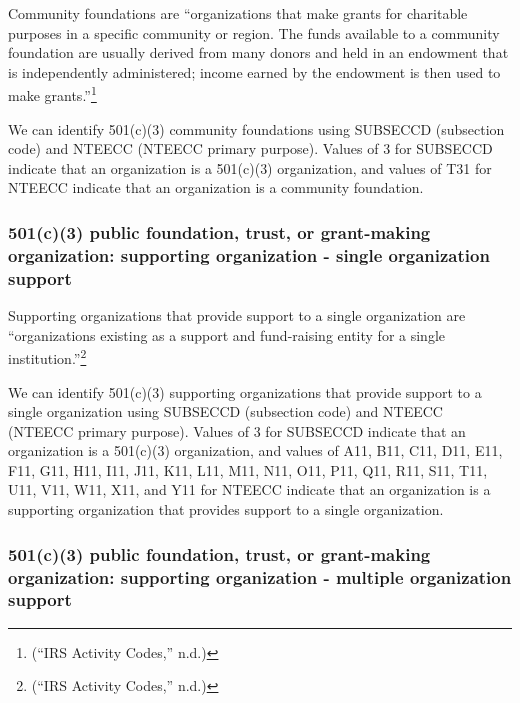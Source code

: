 \documentclass[
  letterpaper,
  DIV=11,
  numbers=noendperiod]{scrreprt}
\begin{document}
Community foundations are ``organizations that make grants for
charitable purposes in a specific community or region. The funds
available to a community foundation are usually derived from many donors
and held in an endowment that is independently administered; income
earned by the endowment is then used to make grants.''\footnote{({``IRS
  Activity Codes,''} n.d.)}

We can identify 501(c)(3) community foundations using SUBSECCD
(subsection code) and NTEECC (NTEECC primary purpose). Values of 3 for
SUBSECCD indicate that an organization is a 501(c)(3) organization, and
values of T31 for NTEECC indicate that an organization is a community
foundation.

\hypertarget{c3-public-foundation-trust-or-grant-making-organization-supporting-organization---single-organization-support}{%
\subsubsection{501(c)(3) public foundation, trust, or grant-making
organization: supporting organization - single organization
support}\label{c3-public-foundation-trust-or-grant-making-organization-supporting-organization---single-organization-support}}

Supporting organizations that provide support to a single organization
are ``organizations existing as a support and fund-raising entity for a
single institution.''\footnote{({``IRS Activity Codes,''} n.d.)}

We can identify 501(c)(3) supporting organizations that provide support
to a single organization using SUBSECCD (subsection code) and NTEECC
(NTEECC primary purpose). Values of 3 for SUBSECCD indicate that an
organization is a 501(c)(3) organization, and values of A11, B11, C11,
D11, E11, F11, G11, H11, I11, J11, K11, L11, M11, N11, O11, P11, Q11,
R11, S11, T11, U11, V11, W11, X11, and Y11 for NTEECC indicate that an
organization is a supporting organization that provides support to a
single organization.

\hypertarget{c3-public-foundation-trust-or-grant-making-organization-supporting-organization---multiple-organization-support}{%
\subsubsection{501(c)(3) public foundation, trust, or grant-making
organization: supporting organization - multiple organization
support}\label{c3-public-foundation-trust-or-grant-making-organization-supporting-organization---multiple-organization-support}}
\end{document}
